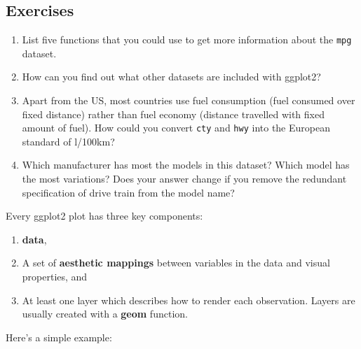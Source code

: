 \subsection{Exercises}

\begin{enumerate}
\def\labelenumi{\arabic{enumi}.}
\item
  List five functions that you could use to get more information about
  the \texttt{mpg} dataset.
\item
  How can you find out what other datasets are included with ggplot2?
\item
  Apart from the US, most countries use fuel consumption (fuel consumed
  over fixed distance) rather than fuel economy (distance travelled with
  fixed amount of fuel). How could you convert \texttt{cty} and
  \texttt{hwy} into the European standard of l/100km?
\item
  Which manufacturer has most the models in this dataset? Which model
  has the most variations? Does your answer change if you remove the
  redundant specification of drive train from the model name?
\end{enumerate}


Every ggplot2 plot has three key components:

\begin{enumerate}
\def\labelenumi{\arabic{enumi}.}
\item
  \textbf{data},
\item
  A set of \textbf{aesthetic mappings} between variables in the data and
  visual properties, and
\item
  At least one layer which describes how to render each observation.
  Layers are usually created with a \textbf{geom} function.
\end{enumerate}

Here's a simple example:  

\begin{Shaded}
\begin{Highlighting}[]
\NormalTok{(}  \StringTok{ }
\StringTok{  }\NormalTok{()}
\end{Highlighting}
\end{Shaded}

